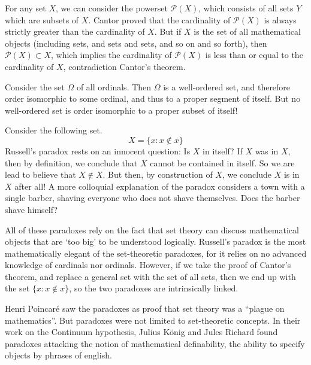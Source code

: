 \begin{example}
    For any set $X$, we can consider the powerset $\mathcal{P}(X)$, which consists of all sets $Y$ which are subsets of $X$. Cantor proved that the cardinality of $\mathcal{P}(X)$ is always strictly greater than the cardinality of $X$. But if $X$ is the set of all mathematical objects (including sets, and sets and sets, and so on and so forth), then $\mathcal{P}(X) \subset X$, which implies the cardinality of $\mathcal{P}(X)$ is less than or equal to the cardinality of $X$, contradiction Cantor's theorem.
\end{example}

\begin{example}
    Consider the set $\Omega$ of all ordinals. Then $\Omega$ is a well-ordered set, and therefore order isomorphic to some ordinal, and thus to a proper segment of itself. But no well-ordered set is order isomorphic to a proper subset of itself!
\end{example}

\begin{example}
    Consider the following set.
    \[ X = \{ x: x \not \in x \} \]
    Russell's paradox rests on an innocent question: Is $X$ in itself? If $X$ was in $X$, then by definition, we conclude that $X$ cannot be contained in itself. So we are lead to believe that $X \not \in X$. But then, by construction of $X$, we conclude $X$ is in $X$ after all! A more colloquial explanation of the paradox considers a town with a single barber, shaving everyone who does not shave themselves. Does the barber shave himself?
\end{example}

All of these paradoxes rely on the fact that set theory can discuss mathematical objects that are `too big' to be understood logically. Russell's paradox is the most mathematically elegant of the set-theoretic paradoxes, for it relies on no advanced knowledge of cardinals nor ordinals. However, if we take the proof of Cantor's theorem, and replace a general set with the set of all sets, then we end up with the set $\{ x : x \not \in x \}$, so the two paradoxes are intrinsically linked.

Henri Poincar\'{e} saw the paradoxes as proof that set theory was a ``plague on mathematics''. But paradoxes were not limited to set-theoretic concepts. In their work on the Continuum hypothesis, Julius K\"{o}nig and Jules Richard found paradoxes attacking the notion of mathematical definability, the ability to specify objects by phrases of english.

